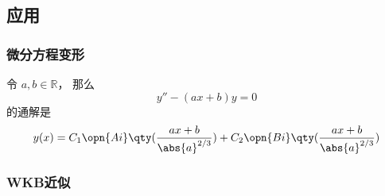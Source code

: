 \subsection{应用}
\subsubsection{微分方程变形}
令 $a, b\in \mathbb R$， 那么
\begin{equation}
y'' - (ax + b) y = 0
\end{equation}
的通解是
\begin{equation}\label{AiryF_eq1}
y(x) = C_1\opn{Ai}\qty(\frac{ax+b}{\abs{a}^{2/3}}) + C_2 \opn{Bi}\qty(\frac{ax+b}{\abs{a}^{2/3}})
\end{equation}
\subsubsection{WKB近似}
